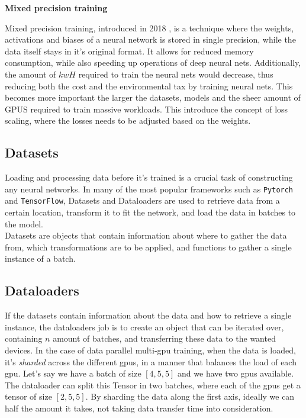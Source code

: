 \textbf{Mixed precision training}

Mixed precision training, introduced in 2018 \cite{micikevicius2018mixed}, is a technique where the weights, activations and biases of a neural network is stored in single precision, while the data itself stays in it's original format. It allows for reduced memory consumption, while also speeding up operations of deep neural nets. Additionally, the amount of $kwH$ required to train the neural nets would decrease, thus reducing both the cost and the environmental tax by training neural nets. This becomes more important the larger the datasets, models and the sheer amount of GPUS required to train massive workloads. This introduce the concept of loss scaling, where the losses needs to be adjusted based on the weights. \\

\subsection{Datasets}

Loading and processing data before it's trained is a crucial task of constructing any neural networks. In many of the most popular frameworks such as \texttt{Pytorch} and \texttt{TensorFlow}, Datasets and Dataloaders are used to retrieve data from a certain location, transform it to fit the network, and load the data in batches to the model. \\

Datasets are objects that contain information about where to gather the data from, which transformations are to be applied, and functions to gather a single instance of a batch.

\subsection{Dataloaders}

If the datasets contain information about the data and how to retrieve a single instance, the dataloaders job is to create an object that can be iterated over, containing $n$ amount of batches, and transferring these data to the wanted devices. In the case of data parallel multi-gpu training, when the data is loaded, it's \textit{sharded} across the different gpus, in a manner that balances the load of each gpu. Let's say we have a batch  of size $[4, 5, 5]$ and we have two gpus available. The dataloader can split this Tensor in two batches, where each of the gpus get a tensor of size $[2, 5, 5]$. By sharding the data along the first axis, ideally we can half the amount it takes, not taking data transfer time into consideration. 

